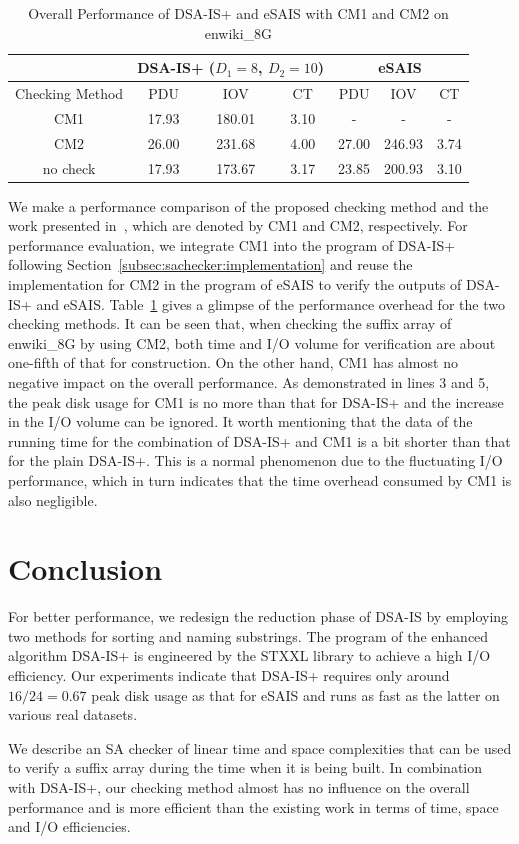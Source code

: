 \documentclass[10pt,journal,compsoc]{IEEEtran}
\begin{document}
\begin{table}[htbp]
	\caption{Overall Performance of DSA-IS+ and eSAIS with CM1 and CM2 on enwiki\_8G}
	\label{tbl:check_overhead}
	\centering
	\begin{tabular}{|c|c|c|c|c|c|c|}
		\hline
		& \multicolumn{3}{|c|}{DSA-IS+ ($D_1 = 8$, $D_2 = 10$)} & \multicolumn{3}{c|}{eSAIS}\\\hline
		Checking Method & PDU & IOV & CT & PDU & IOV & CT \\\hline
		CM1 & 17.93  & 180.01 & 3.10 & - & - & - \\\hline
		CM2 & 26.00 & 231.68 & 4.00 & 27.00 & 246.93 & 3.74 \\\hline
		no check & 17.93  & 173.67	& 3.17 & 23.85 & 200.93 & 3.10 \\\hline
	\end{tabular}
\end{table}%


We make a performance comparison of the proposed checking method and the work presented in~\cite{Karkkainen2003}, which are denoted by CM1 and CM2, respectively. For performance evaluation, we integrate CM1 into the program of DSA-IS+ following Section~\ref{subsec:sachecker:implementation} and reuse the implementation for CM2 in the program of eSAIS to verify the outputs of DSA-IS+ and eSAIS. Table~\ref{tbl:check_overhead} gives a glimpse of the performance overhead for the two checking methods. It can be seen that, when checking the suffix array of enwiki\_8G by using CM2, both time and I/O volume for verification are about one-fifth of that for construction. On the other hand, CM1 has almost no negative impact on the overall performance. As demonstrated in lines 3 and 5, the peak disk usage for CM1 is no more than that for DSA-IS+ and the increase in the I/O volume can be ignored. It worth mentioning that the data of the running time for the combination of DSA-IS+ and CM1 is a bit shorter than that for the plain DSA-IS+. This is a normal phenomenon due to the fluctuating I/O performance, which in turn indicates that the time overhead consumed by CM1 is also negligible.




\section{Conclusion} \label{sec:conclusion}

For better performance, we redesign the reduction phase of DSA-IS by employing two methods for sorting and naming substrings. The program of the enhanced algorithm DSA-IS+ is engineered by the STXXL library to achieve a high I/O efficiency. Our experiments indicate that DSA-IS+ requires only around $16/24=0.67$ peak disk usage as that for eSAIS and runs as fast as the latter on various real datasets.

We describe an SA checker of linear time and space complexities that can be used to verify a suffix array during the time when it is being built. In combination with DSA-IS+, our checking method almost has no influence on the overall performance and is more efficient than the existing work in terms of time, space and I/O efficiencies.



\end{document}

